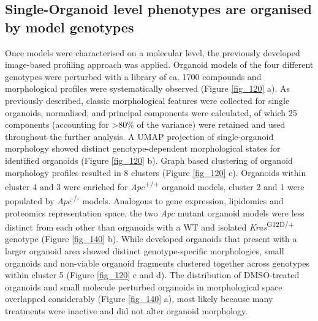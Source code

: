 \begin{flushleft}
\subsection{Single-Organoid level phenotypes are organised by model genotypes}
Once models were characterised on a molecular level, the previously developed image-based profiling approach was applied. Organoid models of the four different genotypes were perturbed with a library of ca. 1700 compounds and morphological profiles were systematically observed (Figure \ref{fig_120} a). As previously described, classic morphological features were collected for single organoids, normalised, and principal components were calculated, of which 25 components (accounting for >80\% of the variance) were retained and used throughout the further analysis. A UMAP projection of single-organoid morphology showed distinct genotype-dependent morphological states for identified organoids (Figure \ref{fig_120} b). Graph based clustering of organoid morphology profiles resulted in 8 clusters (Figure \ref{fig_120} c). Organoids within cluster 4 and 3 were enriched for \textit{Apc}\textsuperscript{+/+} organoid models, cluster 2 and 1 were populated by \textit{Apc}\textsuperscript{-/-}  models. Analogous to gene expression, lipidomics and proteomics representation space, the two \textit{Apc} mutant organoid models were less distinct from each other than organoids with a WT and isolated \textit{Kras}\textsuperscript{G12D/+} genotype (Figure \ref{fig_140} b). While developed organoids that present with a larger organoid area showed distinct genotype-specific morphologies, small organoids and non-viable organoid fragments clustered together across genotypes within cluster 5 (Figure \ref{fig_120} c and d). The distribution of DMSO-treated organoids and small molecule perturbed organoids in morphological space overlapped considerably (Figure \ref{fig_140} a), most likely because many treatments were inactive and did not alter organoid morphology. 


\end{flushleft}
